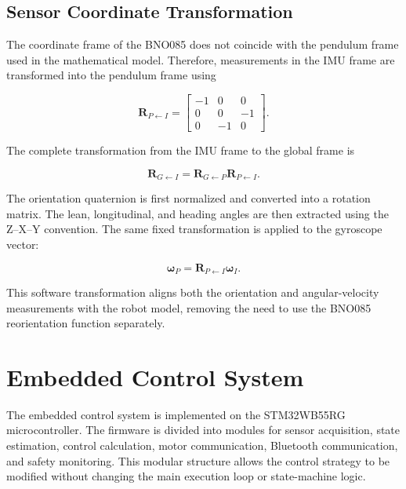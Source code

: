 \subsection{Sensor Coordinate Transformation}

The coordinate frame of the BNO085 does not coincide with the pendulum frame used in the mathematical model. Therefore, measurements in the IMU frame are transformed into the pendulum frame using

\begin{equation}
\mathbf{R}_{P\leftarrow I}
=
\begin{bmatrix}
-1 & 0 & 0 \\
0 & 0 & -1 \\
0 & -1 & 0
\end{bmatrix}.
\label{eq:imu-pendulum-transformation}
\end{equation}

The complete transformation from the IMU frame to the global frame is

\begin{equation}
\mathbf{R}_{G\leftarrow I}
=
\mathbf{R}_{G\leftarrow P}
\mathbf{R}_{P\leftarrow I}.
\end{equation}

The orientation quaternion is first normalized and converted into a rotation matrix. The lean, longitudinal, and heading angles are then extracted using the Z--X--Y convention. The same fixed transformation is applied to the gyroscope vector:

\begin{equation}
\boldsymbol{\omega}_{P}
=
\mathbf{R}_{P\leftarrow I}
\boldsymbol{\omega}_{I}.
\end{equation}

This software transformation aligns both the orientation and angular-velocity measurements with the robot model, removing the need to use the BNO085 reorientation function separately.


\section{Embedded Control System}
\label{sec:embedded-control-system}

The embedded control system is implemented on the STM32WB55RG microcontroller. The firmware is divided into modules for sensor acquisition, state estimation, control calculation, motor communication, Bluetooth communication, and safety monitoring. This modular structure allows the control strategy to be modified without changing the main execution loop or state-machine logic.

